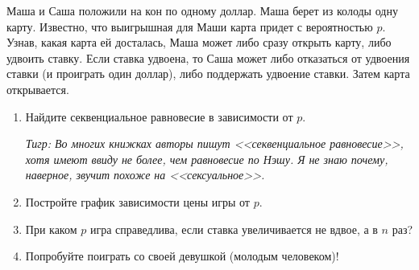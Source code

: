 \begin{problem}
Маша и Саша положили на кон по одному доллар. Маша берет из колоды одну карту. Известно, что выигрышная для Маши карта придет с вероятностью  $p$. Узнав, какая карта ей досталась, Маша может либо сразу открыть карту, либо удвоить ставку. Если ставка удвоена, то Саша может либо отказаться от удвоения ставки (и проиграть один доллар), либо поддержать удвоение ставки. Затем карта открывается.\par
\begin{enumerate}
\item Найдите секвенциальное равновесие в зависимости от  $p$. \par
{\it Тигр: Во многих книжках авторы пишут <<секвенциальное равновесие>>, хотя имеют ввиду не более, чем равновесие по Нэшу. Я не знаю почему, наверное, звучит похоже на <<сексуальное>>.}\par
\item Постройте график зависимости цены игры от  $p$.\par
\item  При каком  $p$  игра справедлива, если ставка увеличивается не вдвое, а в  $n$  раз?\par
\item Попробуйте поиграть со своей девушкой (молодым человеком)!\par
\end{enumerate}


\begin{sol}

\end{sol}
\end{problem}



